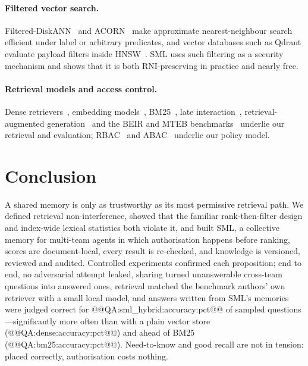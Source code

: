 \documentclass[11pt,a4paper]{article}
\theoremstyle{remark}
\newcommand{\sys}{SML}
\begin{document}
\paragraph{Filtered vector search.} Filtered-DiskANN~\cite{gollapudi2023filtered} and ACORN~\cite{patel2024acorn} make
approximate nearest-neighbour search efficient under label or arbitrary predicates, and vector databases such as Qdrant
evaluate payload filters inside HNSW~\cite{malkov2020hnsw}. \sys{} uses such filtering as a security mechanism and shows that it
is both RNI-preserving in practice and nearly free.

\paragraph{Retrieval models and access control.} Dense retrievers~\cite{reimers2019sbert,karpukhin2020dpr,lin2023dragon},
embedding models~\cite{xiao2023cpack,wang2020minilm}, BM25~\cite{robertson2009bm25}, late interaction~\cite{khattab2020colbert},
retrieval-augmented generation~\cite{lewis2020rag} and the BEIR and MTEB benchmarks~\cite{thakur2021beir,muennighoff2023mteb}
underlie our retrieval and evaluation; RBAC~\cite{sandhu1996rbac} and ABAC~\cite{hu2014abac} underlie our policy model.

\section{Conclusion}
\label{sec:conclusion}

A shared memory is only as trustworthy as its most permissive retrieval path. We defined retrieval non-interference,
showed that the familiar rank-then-filter design and index-wide lexical statistics both violate it, and built \sys{},
a collective memory for multi-team agents in which authorisation happens before ranking, scores are document-local,
every result is re-checked, and knowledge is versioned, reviewed and audited. Controlled experiments confirmed each
proposition; end to end, no adversarial attempt leaked, sharing turned unanswerable cross-team questions into answered ones,
retrieval matched the benchmark authors' own retriever with a small local model, and answers written from \sys{}'s memories
were judged correct for @@QA:sml_hybrid:accuracy:pct@@ of sampled questions---significantly more often than with a plain vector
store (@@QA:dense:accuracy:pct@@) and ahead of BM25 (@@QA:bm25:accuracy:pct@@). Need-to-know and good recall are not in
tension: placed correctly, authorisation costs nothing.
\end{document}
